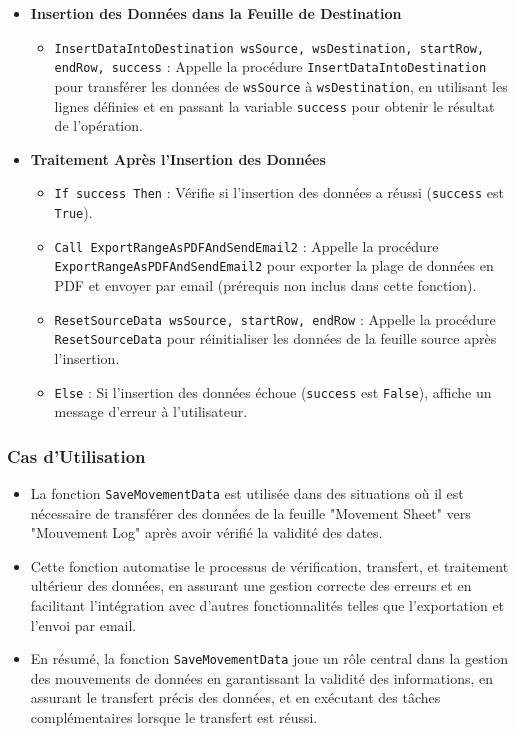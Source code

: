 \documentclass[a4paper, oneside, 12pt, final]{extreport}
\begin{document}
\begin{itemize}
    \item \textbf{Insertion des Données dans la Feuille de Destination}
    \begin{itemize}
        \item \texttt{InsertDataIntoDestination wsSource, wsDestination, startRow, endRow, success} : Appelle la procédure \texttt{InsertDataIntoDestination} pour transférer les données de \texttt{wsSource} à \texttt{wsDestination}, en utilisant les lignes définies et en passant la variable \texttt{success} pour obtenir le résultat de l'opération.
    \end{itemize}

    \item \textbf{Traitement Après l'Insertion des Données}
    \begin{itemize}
        \item \texttt{If success Then} : Vérifie si l'insertion des données a réussi (\texttt{success} est \texttt{True}).
        \item \texttt{Call ExportRangeAsPDFAndSendEmail2} : Appelle la procédure \texttt{ExportRangeAsPDFAndSendEmail2} pour exporter la plage de données en PDF et envoyer par email (prérequis non inclus dans cette fonction).
        \item \texttt{ResetSourceData wsSource, startRow, endRow} : Appelle la procédure \texttt{ResetSourceData} pour réinitialiser les données de la feuille source après l'insertion.
        \item \texttt{Else} : Si l'insertion des données échoue (\texttt{success} est \texttt{False}), affiche un message d'erreur à l'utilisateur.
    \end{itemize}
\end{itemize}

\subsubsection{Cas d'Utilisation}

\begin{itemize}
    \item La fonction \texttt{SaveMovementData} est utilisée dans des situations où il est nécessaire de transférer des données de la feuille "Movement Sheet" vers "Mouvement Log" après avoir vérifié la validité des dates.
    \item Cette fonction automatise le processus de vérification, transfert, et traitement ultérieur des données, en assurant une gestion correcte des erreurs et en facilitant l'intégration avec d'autres fonctionnalités telles que l'exportation et l'envoi par email.
    \item En résumé, la fonction \texttt{SaveMovementData} joue un rôle central dans la gestion des mouvements de données en garantissant la validité des informations, en assurant le transfert précis des données, et en exécutant des tâches complémentaires lorsque le transfert est réussi.
\end{itemize}
\end{document}
